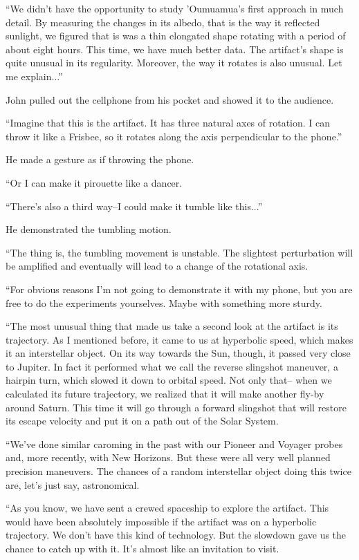 \documentclass[12pt]{book}
\begin{document}
``We didn't have the opportunity to study 'Oumuamua's first approach in much detail. By measuring the changes in its albedo, that is the way it reflected sunlight, we figured that is was a thin elongated shape rotating with a period of about eight hours. This time, we have much better data. The artifact's shape is quite unusual in its regularity. Moreover, the way it rotates is also unusual. Let me explain...''

John pulled out the cellphone from his pocket and showed it to the audience.

``Imagine that this is the artifact. It has three natural axes of rotation. I can throw it like a Frisbee, so it rotates along the axis perpendicular to the phone.''

He made a gesture as if throwing the phone.

``Or I can make it pirouette like a dancer.

``There's also a third way--I could make it tumble like this...''

He demonstrated the tumbling motion.

``The thing is, the tumbling movement is unstable. The slightest perturbation will be amplified and eventually will lead to a change of the rotational axis. 

``For obvious reasons I'm not going to demonstrate it with my phone, but you are free to do the experiments yourselves. Maybe with something more sturdy.

``The most unusual thing that made us take a second look at the artifact is its trajectory. As I mentioned before, it came to us at hyperbolic speed, which makes it an interstellar object. On its way towards the Sun, though, it passed very close to Jupiter. In fact it performed what we call the reverse slingshot maneuver, a hairpin turn, which slowed it down to orbital speed. Not only that-- when we calculated its future trajectory, we realized that it will make another fly-by around Saturn. This time it will go through a forward slingshot that will restore its escape velocity and put it on a path out of the Solar System.

``We've done similar caroming in the past with our Pioneer and Voyager probes and, more recently, with New Horizons. But these were all very well planned precision maneuvers. The chances of a random interstellar object doing this twice are, let's just say, astronomical. 

``As you know, we have sent a crewed spaceship to explore the artifact. This would have been absolutely impossible if the artifact was on a hyperbolic trajectory. We don't have this kind of technology. But the slowdown gave us the chance to catch up with it. It's almost like an invitation to visit.
\end{document}
